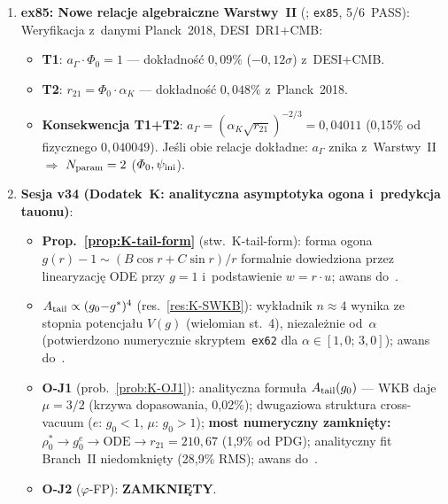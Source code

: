 \begin{remark}
\begin{enumerate}[nosep]
    Aksjomat N0-5 ($\beta=\gamma$) ma dodatkowe uzasadnienie
    dynamiczne --- selekcja potencja\l{}u.
  \item \textbf{ex85: Nowe relacje algebraiczne Warstwy~II}
    (; \texttt{ex85}, 5/6~PASS):
    Weryfikacja z~danymi Planck~2018, DESI~DR1+CMB:
    \begin{itemize}[nosep]
      \item \textbf{T1}: $a_\Gamma\cdot\Phi_0 = 1$ ---
        dok\l{}adno\'s\'c $0{,}09\%$ ($-0{,}12\sigma$) z~DESI+CMB.
      \item \textbf{T2}: $r_{21} = \Phi_0 \cdot \alpha_K$ ---
        dok\l{}adno\'s\'c $0{,}048\%$ z~Planck~2018.
      \item \textbf{Konsekwencja T1+T2}:
        $a_\Gamma = (\alpha_K \sqrt{r_{21}})^{-2/3} = 0{,}04011$
        (0{,}15\% od fizycznego $0{,}040049$).
        Je\'sli obie relacje dok\l{}adne:
        $a_\Gamma$ znika z~Warstwy~II
        $\Rightarrow$ $N_{\rm param}=2$ ($\Phi_0, \psi_{\rm ini}$).
    \end{itemize}
  \item \textbf{Sesja v34 (Dodatek~K: analityczna asymptotyka ogona i~predykcja tauonu)}:
    \begin{itemize}[nosep]
      \item \textbf{Prop.~\ref{prop:K-tail-form}} (stw.~K-tail-form):
        forma ogona $g(r){-}1 \sim (B\cos r + C\sin r)/r$
        formalnie dowiedziona przez linearyzacj\k{e} ODE przy $g=1$
        i~podstawienie $w = r\cdot u$; awans do~.
      \item \textbf{$A_{\rm tail} \propto (g_0{-}g^*)^4$}
        (res.~\ref{res:K-SWKB}):
        wyk\l{}adnik $n \approx 4$ wynika ze stopnia potencja\l{}u $V(g)$
        (wielomian st.~4), niezale\.znie od~$\alpha$
        (potwierdzono numerycznie skryptem~\texttt{ex62} dla
        $\alpha \in [1{,}0;\, 3{,}0]$); awans do~.
      \item \textbf{O-J1} (prob.~\ref{prob:K-OJ1}):
        analityczna formu\l{}a $A_{\rm tail}(g_0)$ --- WKB daje
        $\mu = 3/2$ (krzywa dopasowania, 0{,}02\%);
        dwugaziowa struktura cross-vacuum ($e$: $g_0<1$, $\mu$: $g_0>1$);
        \textbf{most numeryczny zamkni\k{e}ty:}
        $\rho_0^* \to g_0^e \to \text{ODE} \to r_{21} = 210{,}67$ (1{,}9\% od PDG);
        analityczny fit Branch~II niedomkni\k{e}ty (28{,}9\% RMS);
        awans do~.
      \item \textbf{O-J2} ($\varphi$-FP): {\bfseries ZAMKNI\k{E}TY}.

\end{itemize}
\end{enumerate}
\end{remark}
